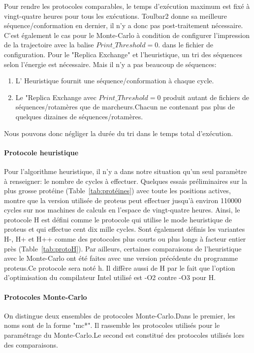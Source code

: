 Pour rendre les protocoles comparables, le temps d'exécution maximum est fixé à vingt-quatre heures pour tous les exécutions.
Toulbar2 donne sa meilleure séquence/conformation en dernier, il n'y a donc pas post-traitement nécessaire.
C'est également le cas pour le Monte-Carlo à condition de configurer l'impression de la trajectoire avec la balise $Print\_Threshold=0$. dans le fichier de configuration.
Pour le "Replica Exchange" et l'heuristique, un tri des séquences selon l'énergie est nécessaire. Mais il n'y a pas beaucoup de séquences: 
\begin{enumerate}
\item L' Heuristique fournit une séquence/conformation à chaque cycle.
\item Le "Replica Exchange avec $Print\_Threshold=0$ produit autant de fichiers de séquences/rotamères que de marcheurs.Chacun ne contenant pas plus de quelques dizaines de séquences/rotamères. 
 \end{enumerate}

Nous pouvons donc négliger la durée du tri dans le temps total d'exécution.    

\paragraph{Protocole heuristique}

Pour l'algorithme heuristique, il n'y a dans notre situation qu'un seul paramètre à renseigner: le nombre de cycles à effectuer. Quelques essais préliminaires sur la plus grosse protéine (Table~\ref{tab:protéines}) avec toute les positions actives, montre que la version utilisée de proteus peut effectuer jusqu'à environ 110000 cycles sur nos machines de calculs en l'espace de vingt-quatre heures. Ainsi, le protocole H est défini comme le protocole qui utilise le mode heuristique de proteus et qui effectue cent dix mille cycles. Sont également définis les variantes H-, H+ et H++ comme des protocoles plus courts ou plus longs à facteur entier près (Table~\ref{tab:protoH}). Par ailleurs, certaines comparaisons de l'heuristique avec le Monte-Carlo ont été faites avec une version précédente du programme proteus.Ce protocole sera noté h. Il diffère aussi de H par le fait que l'option d'optimisation du compilateur Intel utilisé est -O2 contre -O3 pour H.    


   \paragraph{Protocoles Monte-Carlo}
\label{para:MC}
On distingue deux ensembles de protocoles Monte-Carlo.Dans le premier, les noms  sont de la forme "mc*". Il rassemble les protocoles utilisés pour le paramétrage du Monte-Carlo.Le second est constitué des protocoles utilisés lors des comparaisons.     

